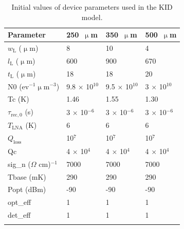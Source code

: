 \begin{table}[!htbp]
\centering
\begin{tabular}{@{}llll@{}}
\dtoprule{}
Parameter                         & 250~$\upmu$m         & 350~$\upmu$m         & 500~$\upmu$m         \\ \midrule
$w_{\mathrm{L}}$ ($\upmu$m)                  & 8                  & 10                 & 4                  \\
$l_{\mathrm{L}}$ ($\upmu$m)                  & 600                & 900                & 670                \\
$t_{\mathrm{L}}$ ($\upmu$m)                  & 18                 & 18                 & 20                 \\
\gls{N0} (ev$^{-1}$$\upmu$m$^{-3}$)     & 9.8 $\times$ 10$^{10}$ & 9.5 $\times$ 10$^{10}$ & 3 $\times$ 10$^{10}$ \\
\gls{Tc} (K)                         & 1.46               & 1.55               & 1.30               \\
$\tau_{\mathrm{rec},0}$ (s)                    & 3 $\times$ 10$^{-6}$ & 3 $\times$ 10$^{-6}$ & 3 $\times$ 10$^{-6}$ \\
$T_{\mathrm{LNA}}$ (K)            & 6                  & 6                  & 6                  \\
$Q_{\mathrm{loss}}$                        & 10$^{7}$           & 10$^{7}$           & 10$^{7}$           \\
\gls{Qc}                           & 4 $\times$ 10$^{4}$  & 4 $\times$ 10$^{4}$  & 4 $\times$ 10$^{4}$  \\
\gls{sig_n} ($\Omega$ cm)$^{-1}$ & 7000               & 7000               & 7000               \\
\gls{Tbase} (mK)          & 290                & 290                & 290                \\
\gls{Popt} (dBm)          & -90                & -90                & -90                \\
\gls{opt_eff}                     & 1                  & 1                  & 1                \\
\gls{det_eff}                     & 1                  & 1                  & 1                \\
\dbottomrule{}
\\
\end{tabular}
\centering
\caption[Initial values of device parameters used in the KID model.]{Initial values of device parameters used in the KID model.}
\label{table:kid sim}
\end{table}

